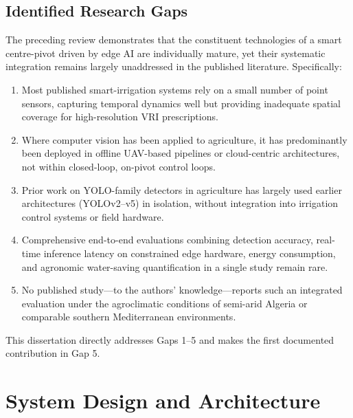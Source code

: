\documentclass[12pt,a4paper]{report}
\begin{document}
\section{Identified Research Gaps}
\label{sec:gap}

The preceding review demonstrates that the constituent technologies of a smart centre-pivot driven by edge AI are individually mature, yet their systematic integration remains largely unaddressed in the published literature. Specifically:

\begin{enumerate}[label=\textbf{Gap \arabic*.}]
    \item Most published smart-irrigation systems rely on a small number of point sensors, capturing temporal dynamics well but providing inadequate spatial coverage for high-resolution VRI prescriptions.
    \item Where computer vision has been applied to agriculture, it has predominantly been deployed in offline UAV-based pipelines or cloud-centric architectures, not within closed-loop, on-pivot control loops.
    \item Prior work on YOLO-family detectors in agriculture has largely used earlier architectures (YOLOv2--v5) in isolation, without integration into irrigation control systems or field hardware.
    \item Comprehensive end-to-end evaluations combining detection accuracy, real-time inference latency on constrained edge hardware, energy consumption, and agronomic water-saving quantification in a single study remain rare.
    \item No published study---to the authors' knowledge---reports such an integrated evaluation under the agroclimatic conditions of semi-arid Algeria or comparable southern Mediterranean environments.
\end{enumerate}

This dissertation directly addresses Gaps 1--5 and makes the first documented contribution in Gap 5.

\chapter{System Design and Architecture}
\label{ch:design}
\pagestyle{fancy}
\thispagestyle{empty}
\end{document}

